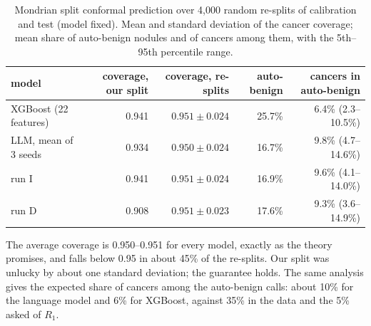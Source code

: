 \begin{table}[ht]
  \centering
  \small
  \caption{Mondrian split conformal prediction over 4,000 random re-splits of calibration and
           test (model fixed). Mean and standard deviation of the cancer coverage; mean share of
           auto-benign nodules and of cancers among them, with the 5th--95th percentile range.}
  \label{tab:results-resplit}
  \setlength{\tabcolsep}{4pt}
  \begin{tabular}{lrrrr}
    \toprule
    model & \multicolumn{1}{p{1.8cm}}{\raggedleft coverage, our split}
          & \multicolumn{1}{p{2.1cm}}{\raggedleft coverage, re-splits}
          & auto-benign
          & \multicolumn{1}{p{2.5cm}}{\raggedleft cancers in auto-benign} \\
    \midrule
    XGBoost (22 features)        & 0.941 & $0.951 \pm 0.024$ & 25.7\% & 6.4\% (2.3--10.5\%) \\
    LLM, mean of 3 seeds         & 0.934 & $0.950 \pm 0.024$ & 16.7\% & 9.8\% (4.7--14.6\%) \\
    run I                        & 0.941 & $0.951 \pm 0.024$ & 16.9\% & 9.6\% (4.1--14.0\%) \\
    run D                        & 0.908 & $0.951 \pm 0.023$ & 17.6\% & 9.3\% (3.6--14.9\%) \\
    \bottomrule
  \end{tabular}
\end{table}

The average coverage is 0.950--0.951 for every model, exactly as the theory promises, and falls
below 0.95 in about 45\% of the re-splits. Our split was unlucky by about one standard deviation;
the guarantee holds. The same analysis gives the expected share of cancers among the auto-benign
calls: about 10\% for the language model and 6\% for XGBoost, against 35\% in the data and the 5\%
asked of $R_1$.
